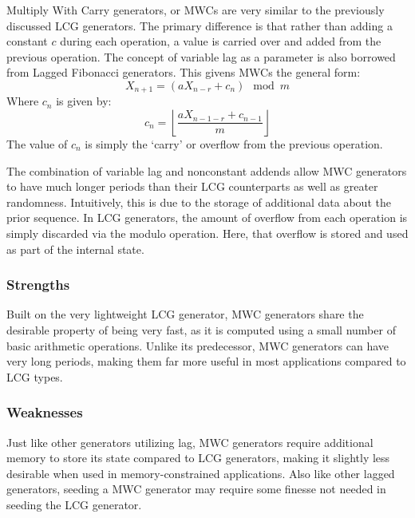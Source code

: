 \def\lc{\left\lfloor}   
\def\rc{\right\rfloor}

Multiply With Carry generators, or MWCs are very similar to the previously discussed LCG generators. The primary difference is that rather than adding a constant $c$ during each operation, a value is carried over and added from the previous operation. The concept of variable lag as a parameter is also borrowed from Lagged Fibonacci generators. This givens MWCs the general form:
\begin{equation} \label{eq:mwc}
    X_{n+1} = (aX_{n-r} + c_n) \mod m
\end{equation}
Where $c_n$ is given by:
\begin{equation} \label{eq:mwc_c}
    c_n = \lc \frac{aX_{n-1-r} + c_{n-1}}{m} \rc
\end{equation}
The value of $c_n$ is simply the `carry' or overflow from the previous operation.

The combination of variable lag and nonconstant addends allow MWC generators to have much longer periods than their LCG counterparts as well as greater randomness. Intuitively, this is due to the storage of additional data about the prior sequence. In LCG generators, the amount of overflow from each operation is simply discarded via the modulo operation. Here, that overflow is stored and used as part of the internal state.

\subsubsection{Strengths}
Built on the very lightweight LCG generator, MWC generators share the desirable property of being very fast, as it is computed using a small number of basic arithmetic operations. Unlike its predecessor, MWC generators can have very long periods, making them far more useful in most applications compared to LCG types.

\subsubsection{Weaknesses}
Just like other generators utilizing lag, MWC generators require additional memory to store its state compared to LCG generators, making it slightly less desirable when used in memory-constrained applications. Also like other lagged generators, seeding a MWC generator may require some finesse not needed in seeding the LCG generator.
